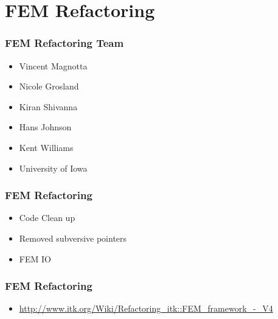 \section{FEM Refactoring}




\begin{frame}
\frametitle{FEM Refactoring Team}
\large
\begin{itemize}
\item Vincent Magnotta
\item Nicole Grosland
\item Kiran Shivanna
\item Hans Johnson
\item Kent Williams
\item University of Iowa
\end{itemize}
\end{frame}


\begin{frame}
\frametitle{FEM Refactoring}
\Huge
\begin{itemize}
\item Code Clean up
\pause
\item Removed subversive pointers
\pause
\item FEM IO
\end{itemize}
\end{frame}


\begin{frame}
\frametitle{FEM Refactoring}
\begin{itemize}
\item \url{http://www.itk.org/Wiki/Refactoring_itk::FEM_framework_-_V4}
\end{itemize}
\end{frame}
